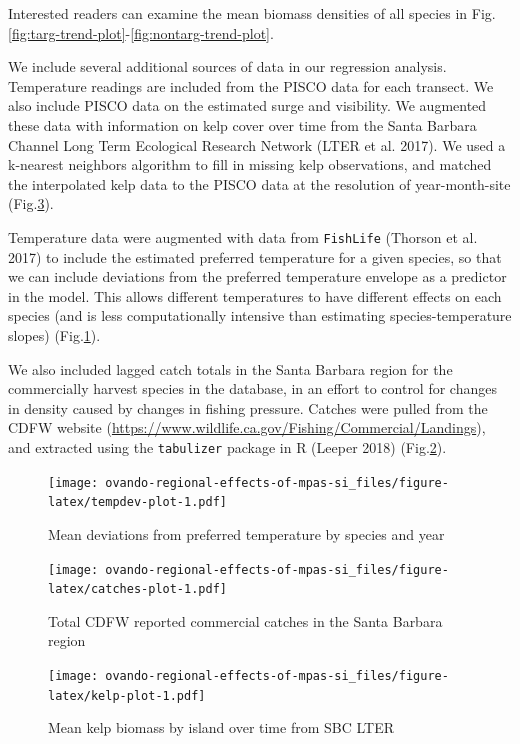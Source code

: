 \documentclass[]{article}
\begin{document}
Interested readers can examine the mean biomass densities of all species in Fig.\ref{fig:targ-trend-plot}-\ref{fig:nontarg-trend-plot}.

We include several additional sources of data in our regression analysis. Temperature readings are included from the PISCO data for each transect. We also include PISCO data on the estimated surge and visibility. We augmented these data with information on kelp cover over time from the Santa Barbara Channel Long Term Ecological Research Network (LTER et al. 2017). We used a k-nearest neighbors algorithm to fill in missing kelp observations, and matched the interpolated kelp data to the PISCO data at the resolution of year-month-site (Fig.\ref{fig:kelp-plot}).

Temperature data were augmented with data from \texttt{FishLife} (Thorson et al. 2017) to include the estimated preferred temperature for a given species, so that we can include deviations from the preferred temperature envelope as a predictor in the model. This allows different temperatures to have different effects on each species (and is less computationally intensive than estimating species-temperature slopes) (Fig.\ref{fig:tempdev-plot}).

We also included lagged catch totals in the Santa Barbara region for the commercially harvest species in the database, in an effort to control for changes in density caused by changes in fishing pressure. Catches were pulled from the CDFW website (\url{https://www.wildlife.ca.gov/Fishing/Commercial/Landings}), and extracted using the \texttt{tabulizer} package in R (Leeper 2018) (Fig.\ref{fig:catches-plot}).

\begin{figure}
\centering
\texttt{[image: ovando-regional-effects-of-mpas-si\_files/figure-latex/tempdev-plot-1.pdf]}
\caption{\label{fig:tempdev-plot}Mean deviations from preferred temperature by species and year}
\end{figure}

\begin{figure}
\centering
\texttt{[image: ovando-regional-effects-of-mpas-si\_files/figure-latex/catches-plot-1.pdf]}
\caption{\label{fig:catches-plot}Total CDFW reported commercial catches in the Santa Barbara region}
\end{figure}

\begin{figure}
\centering
\texttt{[image: ovando-regional-effects-of-mpas-si\_files/figure-latex/kelp-plot-1.pdf]}
\caption{\label{fig:kelp-plot}Mean kelp biomass by island over time from SBC LTER}
\end{figure}
\end{document}
